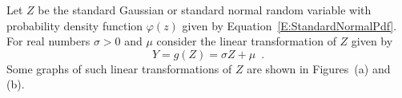 \begin{example}\label{Eg:LinearTransfStdGaussianGaussian}
Let $Z$ be the standard Gaussian or standard normal random variable with probability density function $\varphi(z)$ given by Equation~\eqref{E:StandardNormalPdf}.  
For real numbers $\sigma > 0$ and $\mu$ consider the linear transformation of $Z$ given by 
$$Y = g(Z) = \sigma Z +\mu \enspace .$$
Some graphs of such linear transformations of $Z$ are shown in Figures~(a) and (b).
\begin{figure}[htbp]
\centering{}
\end{figure}


\end{example}
